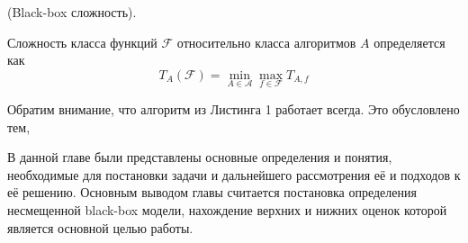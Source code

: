 \begin{definition}
(Black-box сложность). 

Сложность класса функций $\mathcal{F}$ относительно класса алгоритмов $A$ определяется как
$$T_{A}(\mathcal{F}) = \min_{A \in \mathcal{A}} \max_{f \in \mathcal{F}} T_{A, f} $$
\end{definition}


Обратим внимание, что алгоритм из Листинга 1 работает всегда. Это обусловлено тем, 


\chapterconclusion
В данной главе были представлены основные определения и понятия, необходимые для постановки задачи и дальнейшего рассмотрения её и подходов к её решению. Основным выводом главы считается постановка определения несмещенной black-box модели, нахождение верхних и нижних оценок которой является основной целью работы.   
